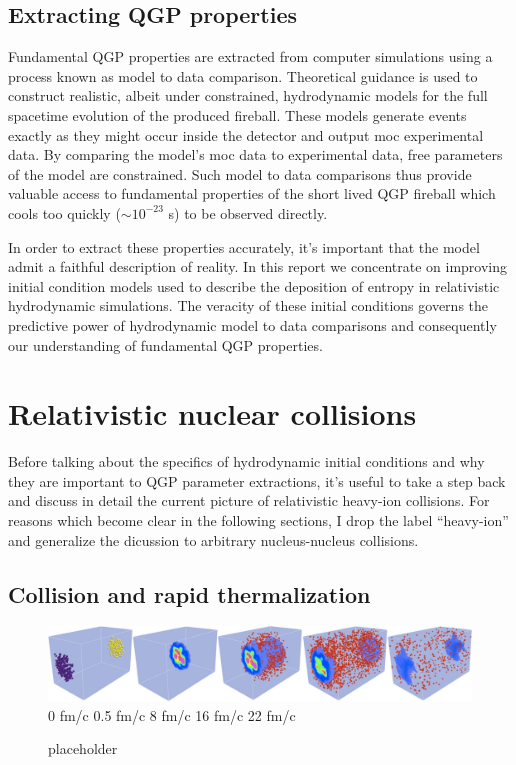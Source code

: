 \documentclass[aps,prc,reprint,amsmath,nofootinbib]{revtex4-1}
\begin{document}
\subsection{Extracting QGP properties}

Fundamental QGP properties are extracted from computer simulations using a process known as model to data comparison. Theoretical guidance is used to construct
realistic, albeit under constrained, hydrodynamic models for the full spacetime evolution of the produced fireball. These models generate events exactly as they might
occur inside the detector and output moc experimental data. By comparing the model's moc data to experimental data, free parameters of the model are constrained. Such 
model to data comparisons thus provide valuable access to fundamental properties of the short lived QGP fireball which cools too quickly (${\sim}10^{-23}$ s) to be 
observed directly.

In order to extract these properties accurately, it's important that the model admit a faithful description of reality. In this report we concentrate on improving 
initial condition models used to describe the deposition of entropy in relativistic hydrodynamic simulations. The veracity of these initial conditions governs the 
predictive power of hydrodynamic model to data comparisons and consequently our understanding of fundamental QGP properties.
  
\section{Relativistic nuclear collisions}

Before talking about the specifics of hydrodynamic initial conditions and why they are important to QGP parameter extractions, it's useful to take a step back 
and discuss in detail the current picture of relativistic heavy-ion collisions. For reasons which become clear in the following sections, I drop the 
label ``heavy-ion'' and generalize the dicussion to arbitrary nucleus-nucleus collisions.

\subsection{Collision and rapid thermalization}

\begin{figure}
  \centering
  \includegraphics[width=\textwidth]{evolution} \\
  0 fm/c   \hspace{.13\textwidth}
  0.5 fm/c \hspace{.13\textwidth}
  8 fm/c   \hspace{.13\textwidth}
  16 fm/c  \hspace{.13\textwidth}
  22 fm/c
  \caption{placeholder \cite{iss}}
  \label{fig:evolution}
\end{figure}
\end{document}
